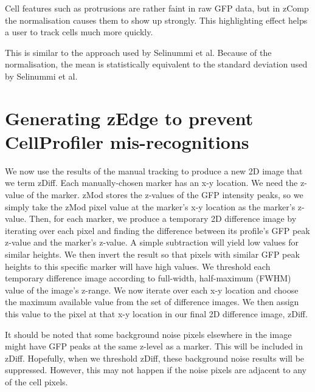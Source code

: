 
Cell features such as protrusions are rather faint in raw GFP data, but in zComp the normalisation causes them to show up strongly. This highlighting effect helps a user to track cells much more quickly.

This is similar to the approach used by Selinummi et al. Because of the normalisation, the mean is statistically equivalent to the standard deviation used by Selinummi et al.

\section{Generating zEdge to prevent CellProfiler mis-recognitions}

We now use the results of the manual tracking to produce a new 2D image that we term zDiff. Each manually-chosen marker has an x-y location. We need the z-value of the marker. zMod stores the z-values of the GFP intensity peaks, so we simply take the zMod pixel value at the marker's x-y location as the marker's z-value. Then, for each marker, we produce a temporary 2D difference image by iterating over each pixel and finding the difference between its profile's GFP peak z-value and the marker's z-value. A simple subtraction will yield low values for similar heights. We then invert the result so that pixels with similar GFP peak heights to this specific marker will have high values. We threshold each temporary difference image according to full-width, half-maximum (FWHM) value of the image's z-range. We now iterate over each x-y location and choose the maximum available value from the set of difference images. We then assign this value to the pixel at that x-y location in our final 2D difference image, zDiff.

It should be noted that some background noise pixels elsewhere in the image might have GFP peaks at the same z-level as a marker. This will be included in zDiff. Hopefully, when we threshold zDiff, these background noise results will be suppressed. However, this may not happen if the noise pixels are adjacent to any of the cell pixels.


